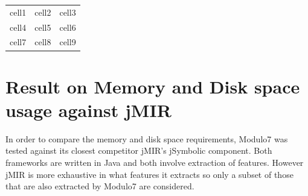 \begin{center}
\begin{tabular}{ c c c }
 cell1 & cell2 & cell3 \\ 
 cell4 & cell5 & cell6 \\  
 cell7 & cell8 & cell9    
\end{tabular}
\end{center}

\section{Result on Memory and Disk space usage against jMIR}

\noindent In order to compare the memory and disk space requirements, Modulo7 was tested against its closest competitor jMIR's \cite{jMIR} jSymbolic component. Both frameworks are written in Java and both involve extraction of features. However jMIR is more exhaustive in what features it extracts so only a subset of those that are also extracted by Modulo7 are considered. 